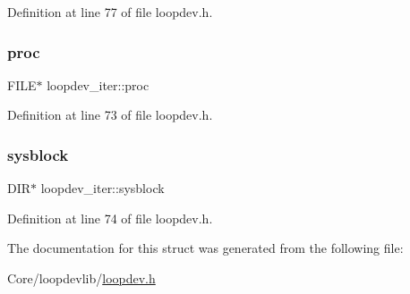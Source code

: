 Definition at line 77 of file loopdev.\+h.

\mbox{\label{structloopdev__iter_a06689bbed3fbd0801ed4616e4638bb22}} 
\subsubsection{\texorpdfstring{proc}{proc}}
{\footnotesize\ttfamily F\+I\+LE$\ast$ loopdev\+\_\+iter\+::proc}



Definition at line 73 of file loopdev.\+h.

\mbox{\label{structloopdev__iter_a30c2d65ed9d5100bb23f5af7748b06c1}} 
\subsubsection{\texorpdfstring{sysblock}{sysblock}}
{\footnotesize\ttfamily D\+IR$\ast$ loopdev\+\_\+iter\+::sysblock}



Definition at line 74 of file loopdev.\+h.



The documentation for this struct was generated from the following file\+:\begin{DoxyCompactItemize}
\item 
Core/loopdevlib/\hyperlink{loopdev_8h}{loopdev.\+h}\end{DoxyCompactItemize}
